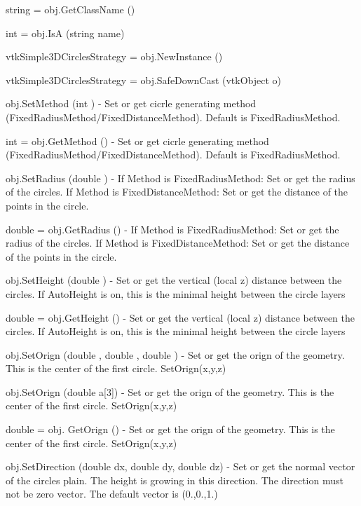 \begin{DoxyItemize}
\item {\ttfamily string = obj.\-Get\-Class\-Name ()}  
\item {\ttfamily int = obj.\-Is\-A (string name)}  
\item {\ttfamily vtk\-Simple3\-D\-Circles\-Strategy = obj.\-New\-Instance ()}  
\item {\ttfamily vtk\-Simple3\-D\-Circles\-Strategy = obj.\-Safe\-Down\-Cast (vtk\-Object o)}  
\item {\ttfamily obj.\-Set\-Method (int )} -\/ Set or get cicrle generating method (Fixed\-Radius\-Method/\-Fixed\-Distance\-Method). Default is Fixed\-Radius\-Method.  
\item {\ttfamily int = obj.\-Get\-Method ()} -\/ Set or get cicrle generating method (Fixed\-Radius\-Method/\-Fixed\-Distance\-Method). Default is Fixed\-Radius\-Method.  
\item {\ttfamily obj.\-Set\-Radius (double )} -\/ If Method is Fixed\-Radius\-Method\-: Set or get the radius of the circles. If Method is Fixed\-Distance\-Method\-: Set or get the distance of the points in the circle.  
\item {\ttfamily double = obj.\-Get\-Radius ()} -\/ If Method is Fixed\-Radius\-Method\-: Set or get the radius of the circles. If Method is Fixed\-Distance\-Method\-: Set or get the distance of the points in the circle.  
\item {\ttfamily obj.\-Set\-Height (double )} -\/ Set or get the vertical (local z) distance between the circles. If Auto\-Height is on, this is the minimal height between the circle layers  
\item {\ttfamily double = obj.\-Get\-Height ()} -\/ Set or get the vertical (local z) distance between the circles. If Auto\-Height is on, this is the minimal height between the circle layers  
\item {\ttfamily obj.\-Set\-Orign (double , double , double )} -\/ Set or get the orign of the geometry. This is the center of the first circle. Set\-Orign(x,y,z)  
\item {\ttfamily obj.\-Set\-Orign (double a\mbox{[}3\mbox{]})} -\/ Set or get the orign of the geometry. This is the center of the first circle. Set\-Orign(x,y,z)  
\item {\ttfamily double = obj. Get\-Orign ()} -\/ Set or get the orign of the geometry. This is the center of the first circle. Set\-Orign(x,y,z)  
\item {\ttfamily obj.\-Set\-Direction (double dx, double dy, double dz)} -\/ Set or get the normal vector of the circles plain. The height is growing in this direction. The direction must not be zero vector. The default vector is (0.,0.,1.)  

\end{DoxyItemize}

